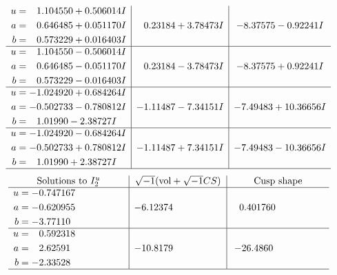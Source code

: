 \documentclass[1p]{elsarticle_modified}
\theoremstyle{definition}
\newcommand{\I}{\sqrt{-1}}
\begin{document}
$$\begin{array}{c|c|c}
\begin{aligned}
u &= \phantom{-}1.104550 + 0.506014 I \\
a &= \phantom{-}0.646485 + 0.051170 I \\
b &= \phantom{-}0.573229 + 0.016403 I\end{aligned}
 & \phantom{-}0.23184 + 3.78473 I & -8.37575 - 0.92241 I \\ \hline\begin{aligned}
u &= \phantom{-}1.104550 - 0.506014 I \\
a &= \phantom{-}0.646485 - 0.051170 I \\
b &= \phantom{-}0.573229 - 0.016403 I\end{aligned}
 & \phantom{-}0.23184 - 3.78473 I & -8.37575 + 0.92241 I \\ \hline\begin{aligned}
u &= -1.024920 + 0.684264 I \\
a &= -0.502733 - 0.780812 I \\
b &= \phantom{-}1.01990 - 2.38727 I\end{aligned}
 & -1.11487 - 7.34151 I & -7.49483 + 10.36656 I \\ \hline\begin{aligned}
u &= -1.024920 - 0.684264 I \\
a &= -0.502733 + 0.780812 I \\
b &= \phantom{-}1.01990 + 2.38727 I\end{aligned}
 & -1.11487 + 7.34151 I & -7.49483 - 10.36656 I\\
 \hline 
 \end{array}$$\newpage$$\begin{array}{c|c|c}  
\text{Solutions to }I^u_{2}& \I (\text{vol} + \sqrt{-1}CS) & \text{Cusp shape}\\
 \hline 
\begin{aligned}
u &= -0.747167\phantom{ +0.000000I} \\
a &= -0.620955\phantom{ +0.000000I} \\
b &= -3.77110\phantom{ +0.000000I}\end{aligned}
 & -6.12374\phantom{ +0.000000I} & \phantom{-}0.401760\phantom{ +0.000000I} \\ \hline\begin{aligned}
u &= \phantom{-}0.592318\phantom{ +0.000000I} \\
a &= \phantom{-}2.62591\phantom{ +0.000000I} \\
b &= -2.33528\phantom{ +0.000000I}\end{aligned}
 & -10.8179\phantom{ +0.000000I} & -26.4860\phantom{ +0.000000I}\\
 \hline 
 \end{array}$$\newpage\newpage\renewcommand{\arraystretch}{1}
\end{document}
